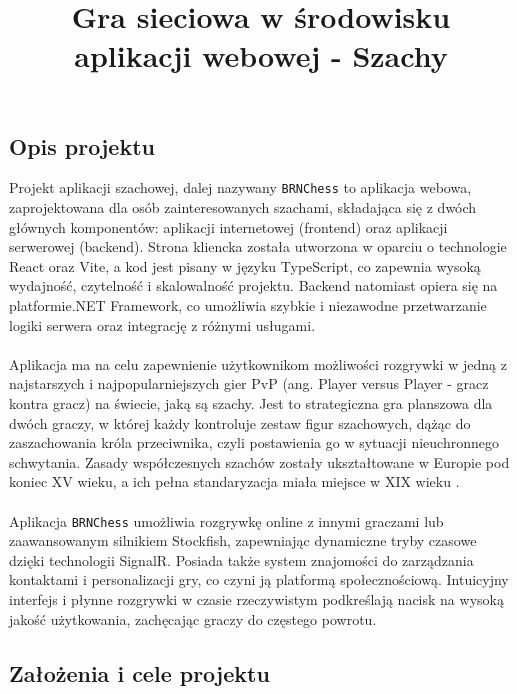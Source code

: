 \documentclass[twoside]{projektInzynierskiMS1}
\title{Gra sieciowa w środowisku aplikacji webowej - Szachy}
\begin{document}
\subsection{\texorpdfstring{Opis projektu}{Opis projektu}}

\noindent
Projekt aplikacji szachowej, dalej nazywany \texttt{BRNChess} to aplikacja webowa, zaprojektowana dla osób zainteresowanych szachami, składająca się z dwóch głównych komponentów: aplikacji internetowej (frontend) oraz aplikacji serwerowej (backend). Strona kliencka została utworzona w oparciu o technologie React oraz Vite, a kod jest pisany w języku TypeScript, co zapewnia wysoką wydajność, czytelność i skalowalność projektu. Backend natomiast opiera się na platformie.NET Framework, co umożliwia szybkie i niezawodne przetwarzanie logiki serwera oraz integrację z różnymi usługami.
\\\\
Aplikacja ma na celu zapewnienie użytkownikom możliwości rozgrywki w jedną z najstarszych i najpopularniejszych gier PvP (ang. Player versus Player - gracz kontra gracz) na świecie, jaką są szachy. Jest to strategiczna gra planszowa dla dwóch graczy, w której każdy kontroluje zestaw figur szachowych, dążąc do zaszachowania króla przeciwnika, czyli postawienia go w sytuacji nieuchronnego schwytania. Zasady współczesnych szachów zostały ukształtowane w Europie pod koniec XV wieku, a ich pełna standaryzacja miała miejsce w XIX wieku \cite{ChessWiki}.
\\\\
Aplikacja \texttt{BRNChess} umożliwia rozgrywkę online z innymi graczami lub zaawansowanym silnikiem Stockfish, zapewniając dynamiczne tryby czasowe dzięki technologii SignalR. Posiada także system znajomości do zarządzania kontaktami i personalizacji gry, co czyni ją platformą społecznościową. Intuicyjny interfejs i płynne rozgrywki w czasie rzeczywistym podkreślają nacisk na wysoką jakość użytkowania, zachęcając graczy do częstego powrotu.

\newpage

\subsection{Założenia i cele projektu}
\end{document}
